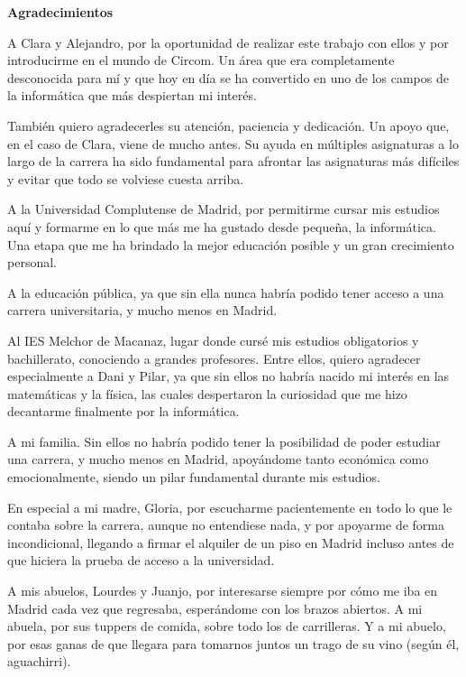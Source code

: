 \documentclass[a4paper,12pt]{report}
\newenvironment{agradecimientos}{%
	\begin{center}
		\bfseries\Large Agradecimientos
	\end{center}
	\vspace{0.5cm}
	\noindent 
}{
	\par\vspace{1cm}
}
\begin{document}
	\begin{agradecimientos}
		\noindent A Clara y Alejandro, por la oportunidad de realizar este trabajo con ellos y por introducirme en el mundo de Circom. Un área que era completamente desconocida para mí y que hoy en día se ha convertido en uno de los campos de la informática que más despiertan mi interés.
		
		\vspace{0.3cm}
		\noindent También quiero agradecerles su atención, paciencia y dedicación. Un apoyo que, en el caso de Clara, viene de mucho antes. Su ayuda en múltiples asignaturas a lo largo de la carrera ha sido fundamental para afrontar las asignaturas más difíciles y evitar que todo se volviese cuesta arriba.
		
		\vspace{0.3cm}
		\noindent A la Universidad Complutense de Madrid, por permitirme cursar mis estudios aquí y formarme en lo que más me ha gustado desde pequeña, la informática. Una etapa que me ha brindado la mejor educación posible y un gran crecimiento personal.
		
		\vspace{0.3cm}
		\noindent A la educación pública, ya que sin ella nunca habría podido tener acceso a una carrera universitaria, y mucho menos en Madrid.
		
		\vspace{0.3cm}
		\noindent Al IES Melchor de Macanaz, lugar donde cursé mis estudios obligatorios y bachillerato, conociendo a grandes profesores. Entre ellos, quiero agradecer especialmente a Dani y Pilar, ya que sin ellos no habría nacido mi interés en las matemáticas y la física, las cuales despertaron la curiosidad que me hizo decantarme finalmente por la informática.
		
		\vspace{0.3cm}
		\noindent A mi familia. Sin ellos no habría podido tener la posibilidad de poder estudiar una carrera, y mucho menos en Madrid, apoyándome tanto económica como emocionalmente, siendo un pilar fundamental durante mis estudios.
		
		\vspace{0.3cm}
		\noindent En especial a mi madre, Gloria, por escucharme pacientemente en todo lo que le contaba sobre la carrera, aunque no entendiese nada, y por apoyarme de forma incondicional, llegando a firmar el alquiler de un piso en Madrid incluso antes de que hiciera la prueba de acceso a la universidad.
		
		\vspace{0.3cm}
		\noindent A mis abuelos, Lourdes y Juanjo, por interesarse siempre por cómo me iba en Madrid cada vez que regresaba, esperándome con los brazos abiertos. A mi abuela, por sus tuppers de comida, sobre todo los de carrilleras. Y a mi abuelo, por esas ganas de que llegara para tomarnos juntos un trago de su vino (según él, aguachirri).
		

\end{agradecimientos}
\end{document}
